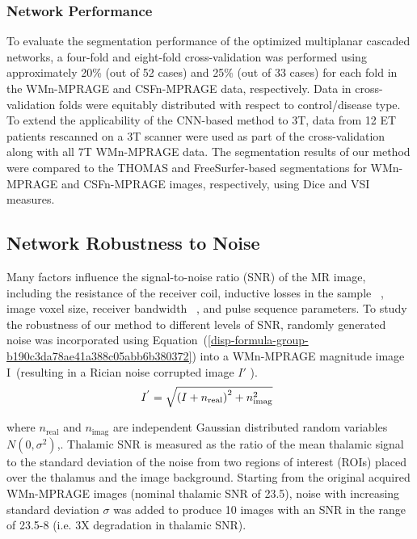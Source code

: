 \subsubsection{Network Performance} To evaluate the segmentation performance of the optimized multiplanar cascaded networks, a four-fold and eight-fold cross-validation was performed using approximately 20\% (out of 52 cases) and 25\% (out of 33 cases) for each fold in the WMn-MPRAGE and CSFn-MPRAGE data, respectively. Data in cross-validation folds were equitably distributed with respect to control/disease type. To extend the applicability of the CNN-based method to 3T, data from 12 ET patients rescanned on a 3T scanner were used as part of the cross-validation along with all 7T WMn-MPRAGE data. The segmentation results of our method were compared to the THOMAS and FreeSurfer-based segmentations for WMn-MPRAGE and CSFn-MPRAGE images, respectively, using Dice and VSI measures. 



\subsection{Network Robustness to Noise}Many factors influence the signal-to-noise ratio (SNR) of the MR image, including the resistance of the receiver coil, inductive losses in the sample \unskip~\cite{1643371:26789940}, image voxel size, receiver bandwidth \unskip~\cite{1643371:26789953}, and pulse sequence parameters. To study the robustness of our method to different levels of SNR, randomly generated noise was incorporated using Equation~(\ref{disp-formula-group-b190c3da78ae41a388c05abb6b380372})  into a WMn-MPRAGE magnitude image I~(resulting in a Rician noise corrupted image $I' $ ). 
\let\saveeqnno\theequation
\let\savefrac\frac
\def\dispfrac{\displaystyle\savefrac}
\begin{eqnarray}
\let\frac\dispfrac
\gdef\theequation{5}
\let\theHequation\theequation
\label{disp-formula-group-b190c3da78ae41a388c05abb6b380372}
\begin{array}{@{}l}I^{'}=\sqrt{{\left(I+n_{\text{real}}\right)}^{2}+n_{\text{imag}}^{2}}\end{array}
\end{eqnarray}
\global\let\theequation\saveeqnno
\addtocounter{equation}{-1}\ignorespaces 
where $n_{\text{real}} $ and $n_{\text{imag}} $ are independent Gaussian distributed random variables $N(0,\sigma ^{2}) $,. Thalamic SNR is measured as the ratio of the mean thalamic signal to the standard deviation of the noise from two regions of interest (ROIs) placed over the thalamus and the image background. Starting from the original acquired WMn-MPRAGE images (nominal thalamic SNR of 23.5), noise with increasing standard deviation $\sigma $ was added to produce 10 images with an SNR in the range of 23.5-8 (i.e. {\texttildeapprox} 3X degradation in thalamic SNR).



